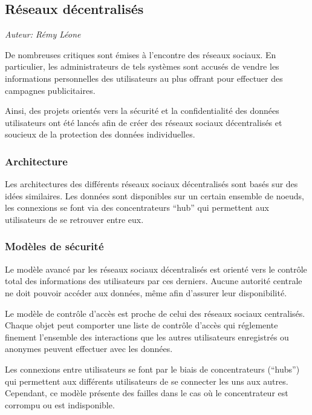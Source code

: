 \subsection{Réseaux décentralisés}

\begin{flushright} \textit{Auteur: Rémy Léone} \end{flushright}

De nombreuses critiques sont émises à l'encontre des réseaux sociaux.  En
particulier, les administrateurs de tels systèmes sont accusés de vendre les
informations personnelles des utilisateurs au plus offrant pour effectuer des
campagnes publicitaires.

Ainsi, des projets orientés vers la sécurité et la confidentialité des données
utilisateurs ont été lancés afin de créer des réseaux sociaux décentralisés et
soucieux de la protection des données individuelles.

\subsubsection{Architecture}

Les architectures des différents réseaux sociaux décentralisés sont basés sur
des idées similaires. Les données sont disponibles sur un certain ensemble de
noeuds, les connexions se font via des concentrateurs ``hub'' qui permettent
aux utilisateurs de se retrouver entre eux. \cite{safebook, vis-a-vis}

\subsubsection{Modèles de sécurité}

Le modèle avancé par les réseaux sociaux décentralisés est orienté vers le
contrôle total des informations des utilisateurs par ces derniers. Aucune
autorité centrale ne doit pouvoir accéder aux données, même afin d'assurer leur
disponibilité.

Le modèle de contrôle d'accès est proche de celui des réseaux sociaux
centralisés.  Chaque objet peut comporter une liste de contrôle d'accès qui
réglemente finement l'ensemble des interactions que les autres utilisateurs
enregistrés ou anonymes peuvent effectuer avec les données.

Les connexions entre utilisateurs se font par le biais de concentrateurs (``hubs'')
qui permettent aux différents utilisateurs de se connecter les uns aux autres.
Cependant, ce modèle présente des failles dans le cas où le concentrateur est
corrompu ou est indisponible.

